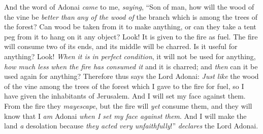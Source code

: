 \begin{biblechapter} %
 And the word of Adonai \textit{came} to me, \textit{saying},
\verse “Son of man, how will the wood of the vine be \textit{better than} \textit{any of the wood of} the branch which is among the trees of the forest?
\verse Can wood be taken from it to make anything, or can they take a tent peg from it to hang on it any object?
\verse Look! It is given to the fire as fuel. The fire will consume two of its ends, and its middle will be charred. Is it useful for anything?
\verse Look! \textit{When it is in perfect condition}, it will not be used for anything, \textit{how much less} \textit{when the fire has consumed it} and it is charred; and \textit{then} can it be used again for anything?
\verse Therefore thus says the Lord Adonai: \textit{Just like} the wood of the vine among the trees of the forest which I gave to the fire for fuel, so I have given the inhabitants of Jerusalem.
\verse And I will set my face against them. From the fire they \textit{may}\textit{escape}, but the fire will \textit{yet} consume them, and they will know that I \textit{am} Adonai \textit{when I set my face against them}.
\verse And I will make the land \textit{a} desolation because \textit{they acted very unfaithfully}!” \textit{declares} the Lord Adonai.
\end{biblechapter}

